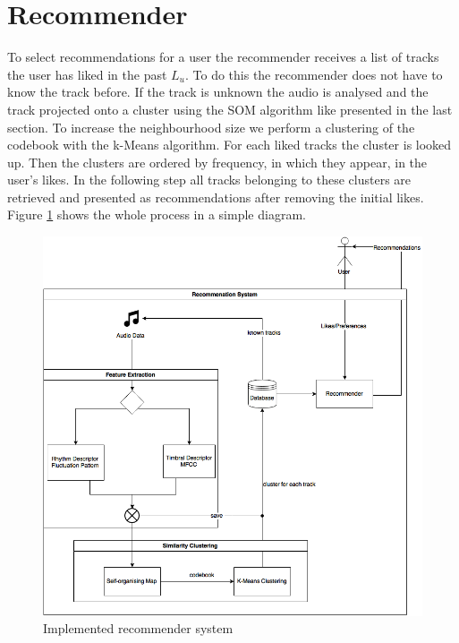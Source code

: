 \documentclass[cic,tc,english]{iiufrgs}
\begin{document}
\section{Recommender}
To select recommendations for a user the recommender receives a list of tracks the user has liked in the past $L_u$. To do this the recommender does not have to know the track before. If the track is unknown the audio is analysed and the track projected onto a cluster using the SOM algorithm like presented in the last section. To increase the neighbourhood size we perform a clustering of the codebook with the k-Means algorithm. For each liked tracks the cluster is looked up. Then the clusters are ordered by frequency, in which they appear, in the user's likes. In the following step all tracks belonging to these clusters are retrieved and presented as recommendations after removing the initial likes. Figure \ref{fig:bloc} shows the whole process in a simple diagram. 

\begin{figure}
    \caption{Implemented recommender system}
    \begin{center}
        \includegraphics[width=\linewidth]{blockdiag}
    \end{center}
    \label{fig:bloc}
\end{figure}
\end{document}
